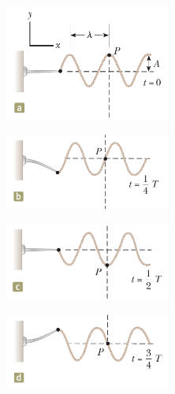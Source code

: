 \begin{figure}[h]
\centering
\begin{subfigure}{0.49\textwidth}
    \centering
    \includegraphics[width=0.6\textwidth]{images/oaw/fig16_10a.png}
\end{subfigure}
\begin{subfigure}{0.49\textwidth}
    \centering
    \includegraphics[width=0.6\textwidth]{images/oaw/fig16_10b.png}
\end{subfigure}
\begin{subfigure}{0.49\textwidth}
    \centering
    \includegraphics[width=0.6\textwidth]{images/oaw/fig16_10c.png}
\end{subfigure}
\begin{subfigure}{0.49\textwidth}
    \centering
    \includegraphics[width=0.6\textwidth]{images/oaw/fig16_10d.png}
\end{subfigure}
\end{figure}

